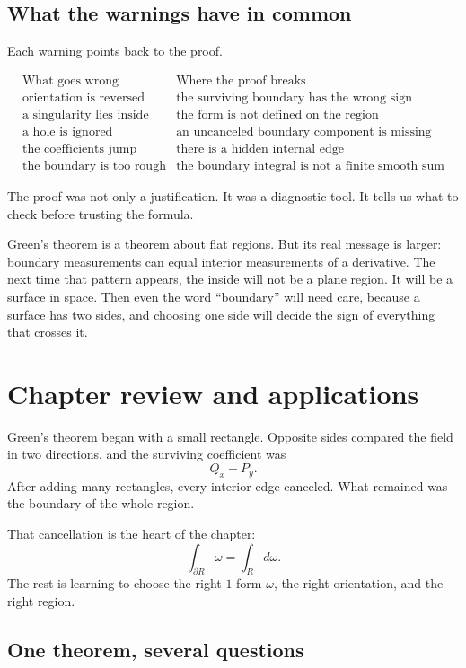 \subsection{What the warnings have in common}

Each warning points back to the proof.

\[
\begin{array}{c|c}
\text{What goes wrong} & \text{Where the proof breaks}\\ \hline
\text{orientation is reversed} & \text{the surviving boundary has the wrong sign}\\[1mm]
\text{a singularity lies inside} & \text{the form is not defined on the region}\\[1mm]
\text{a hole is ignored} & \text{an uncanceled boundary component is missing}\\[1mm]
\text{the coefficients jump} & \text{there is a hidden internal edge}\\[1mm]
\text{the boundary is too rough} & \text{the boundary integral is not a finite smooth sum}
\end{array}
\]

The proof was not only a justification.  It was a diagnostic tool.  It tells us what to
check before trusting the formula.

Green's theorem is a theorem about flat regions.  But its real message is larger:
boundary measurements can equal interior measurements of a derivative.  The next
time that pattern appears, the inside will not be a plane region.  It will be a surface in
space.  Then even the word ``boundary'' will need care, because a surface has two
sides, and choosing one side will decide the sign of everything that crosses it.
\section{Chapter review and applications}
\label{sec:14.7}

Green's theorem began with a small rectangle.  Opposite sides compared the field in
two directions, and the surviving coefficient was
\[
    Q_x-P_y.
\]
After adding many rectangles, every interior edge canceled.  What remained was the
boundary of the whole region.

That cancellation is the heart of the chapter:
\[
\boxed{
    \int_{\partial R}\omega=\int_R d\omega.
}
\]
The rest is learning to choose the right \(1\)-form \(\omega\), the right orientation, and
the right region.

\subsection{One theorem, several questions}

